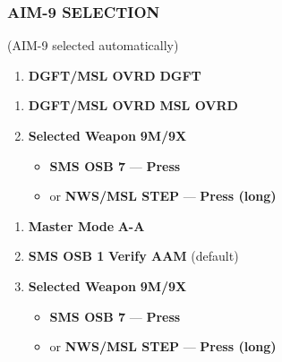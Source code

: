 \subsubsection{AIM-9 SELECTION}
\begin{checklistitemize}
    (AIM-9 selected automatically)
    \begin{enumerate}
        \item \textbf{DGFT/MSL OVRD} \dotfill \textbf{DGFT}
    \end{enumerate}
    \begin{enumerate}
        \item \textbf{DGFT/MSL OVRD} \dotfill \textbf{MSL OVRD}
        \item \textbf{Selected Weapon} \dotfill \textbf{9M/9X}
        \begin{itemize}
            \item \textbf{SMS OSB 7} --- \textbf{Press}
            \item or \textbf{NWS/MSL STEP} --- \textbf{Press (long)}
        \end{itemize}
    \end{enumerate}
    \begin{enumerate}
        \item \textbf{Master Mode} \dotfill \textbf{A-A}
        \item \textbf{SMS OSB 1} \dotfill \textbf{Verify AAM} (default)
        \item \textbf{Selected Weapon} \dotfill \textbf{9M/9X}
        \begin{itemize}
            \item \textbf{SMS OSB 7} --- \textbf{Press}
            \item or \textbf{NWS/MSL STEP} --- \textbf{Press (long)}
        \end{itemize}
    \end{enumerate}
\end{checklistitemize}

